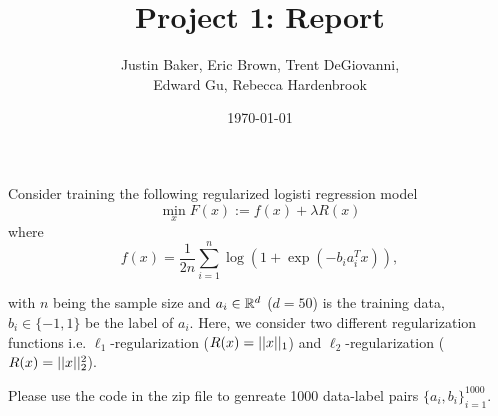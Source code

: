 \documentclass[11pt, answers]{exam}
\title{Project 1: Report}
\author{Justin Baker, Eric Brown, Trent DeGiovanni,\\ Edward Gu, Rebecca Hardenbrook}
\date{\today}
\begin{document}
\maketitle

Consider training the following regularized logisti regression model
$$\min_x F(x):= f(x)+\lambda R(x)$$
where
$$f(x)=\frac{1}{2n}\sum^n_{i=1}\log(1+\exp(-b_ia_i^Tx)),$$

with $n$ being the sample size and $a_i\in\mathbb{R}^d$ ($d=50$) is the training data,
$b_i\in\{-1,1\}$ be the label of $a_i$. 
Here, we consider two different regularization functions 
i.e. $\ell_1$-regularization ($R(x)=|| x ||_1$) 
and $\ell_2$-regularization ($R(x)=|| x ||_2^2$).


Please use the code in the zip file to genreate 1000 data-label pairs $\{a_i,b_i\}^{1000}_{i=1}.$
\end{document}
